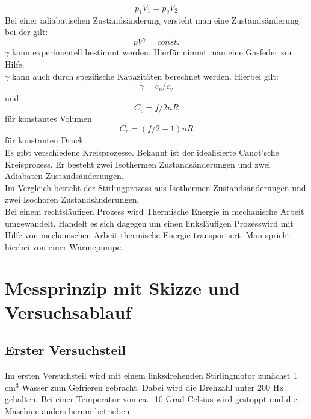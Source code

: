\documentclass[12pt,a4paper]{scrartcl}
\begin{document}
\begin{equation}
p_1V_1 = p_2V_2
\end{equation}
Bei einer adiabatischen Zustandsänderung versteht man eine Zustandsänderung bei der gilt:
\begin{equation}
pV^\gamma = const.
\end{equation}
$\gamma$ kann experimentell bestimmt werden. Hierfür nimmt man eine Gasfeder zur Hilfe. \\
$\gamma$ kann auch durch spezifische Kapazitäten berechnet werden. Hierbei gilt:\\
\begin{equation}
\gamma =c_p/c_v
\end{equation}
 und \\
 \begin{equation}
 C_v = f/2 n R
 \end{equation}
 für konstantes Volumen\\
 \begin{equation}
 C_p = (f/2+1)n R
 \end{equation}
für konstanten Druck \\
Es gibt verschiedene Kreisprozesse. Bekannt ist der idealisierte Canot’sche Kreisprozess. Er besteht zwei Isothermen Zustandsänderungen und zwei Adiabaten Zustandsänderungen. \\
Im Vergleich besteht der Stirlingprozess aus Isothermen Zustandsänderungen und zwei Isochoren Zustandsänderungen.\\
Bei einem rechtsläufigen Prozess wird Thermische Energie in mechanische Arbeit umgewandelt. Handelt es sich dagegen um einen linksläufigen Prozesswird mit Hilfe von mechanischen Arbeit thermische Energie transportiert. Man spricht hierbei von einer Wärmepumpe.\\




\section{Messprinzip mit Skizze und Versuchsablauf} 
\subsection{Erster Versuchsteil}
Im ersten Versuchsteil wird mit einem linksdrehenden Stirlingmotor zunächst 1 cm$^3$ Wasser zum Gefrieren gebracht. Dabei wird die Drehzahl unter 200 Hz gehalten. Bei einer Temperatur von ca. -10 Grad Celsius wird gestoppt und die Maschine anders herum betrieben.
\end{document}
